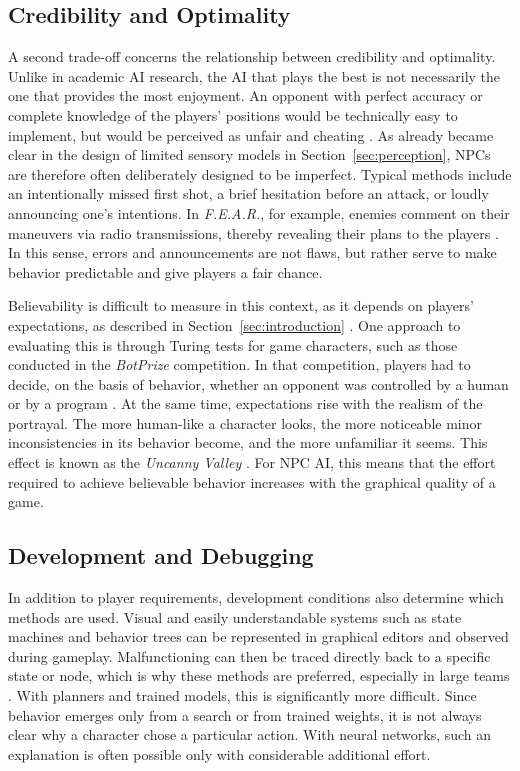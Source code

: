 \subsection{Credibility and Optimality}

A second trade-off concerns the relationship between credibility and optimality. Unlike in academic AI research, the AI that plays the best is not necessarily the one that provides the most enjoyment. An opponent with perfect accuracy or complete knowledge of the players’ positions would be technically easy to implement, but would be perceived as unfair and cheating \cite{yannakakis2018}. As already became clear in the design of limited sensory models in Section~\ref{sec:perception}, NPCs are therefore often deliberately designed to be imperfect. Typical methods include an intentionally missed first shot, a brief hesitation before an attack, or loudly announcing one’s intentions. In \emph{F.E.A.R.}, for example, enemies comment on their maneuvers via radio transmissions, thereby revealing their plans to the players \cite{orkin2006}. In this sense, errors and announcements are not flaws, but rather serve to make behavior predictable and give players a fair chance.

Believability is difficult to measure in this context, as it depends on players’ expectations, as described in Section~\ref{sec:introduction} \cite{warpefelt2017}. One approach to evaluating this is through Turing tests for game characters, such as those conducted in the \emph{BotPrize} competition. In that competition, players had to decide, on the basis of behavior, whether an opponent was controlled by a human or by a program \cite{hingston2009}. At the same time, expectations rise with the realism of the portrayal. The more human-like a character looks, the more noticeable minor inconsistencies in its behavior become, and the more unfamiliar it seems. This effect is known as the \emph{Uncanny Valley} \cite{mori2012}. For NPC AI, this means that the effort required to achieve believable behavior increases with the graphical quality of a game.

\subsection{Development and Debugging}

In addition to player requirements, development conditions also determine which methods are used.
 Visual and easily understandable systems such as state machines and behavior trees can be represented in graphical editors and observed during gameplay. Malfunctioning can then be traced directly back to a specific state or node, which is why these methods are preferred, especially in large teams \cite{colledanchise2018}. With planners and trained models, this is significantly more difficult.
 Since behavior emerges only from a search or from trained weights, it is not always clear why a character chose a particular action. With neural networks, such an explanation is often possible only with considerable additional effort.

